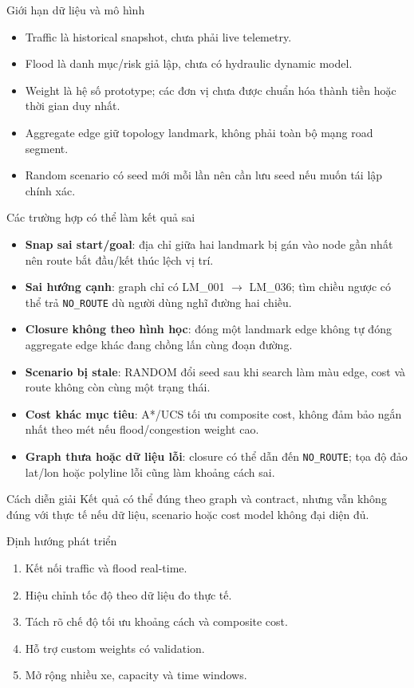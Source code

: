 \documentclass[aspectratio=169,11pt]{beamer}
\begin{document}
\begin{frame}{Giới hạn dữ liệu và mô hình}
\begin{itemize}
  \item Traffic là historical snapshot, chưa phải live telemetry.
  \item Flood là danh mục/risk giả lập, chưa có hydraulic dynamic model.
  \item Weight là hệ số prototype; các đơn vị chưa được chuẩn hóa thành tiền hoặc thời gian duy nhất.
  \item Aggregate edge giữ topology landmark, không phải toàn bộ mạng road segment.
  \item Random scenario có seed mới mỗi lần nên cần lưu seed nếu muốn tái lập chính xác.
\end{itemize}
\end{frame}

\begin{frame}{Các trường hợp có thể làm kết quả sai}
\footnotesize
\begin{itemize}
  \item \textbf{Snap sai start/goal}: địa chỉ giữa hai landmark bị gán vào node gần nhất nên route bắt đầu/kết thúc lệch vị trí.
  \item \textbf{Sai hướng cạnh}: graph chỉ có LM\_001 $\rightarrow$ LM\_036; tìm chiều ngược có thể trả \texttt{NO\_ROUTE} dù người dùng nghĩ đường hai chiều.
  \item \textbf{Closure không theo hình học}: đóng một landmark edge không tự đóng aggregate edge khác đang chồng lấn cùng đoạn đường.
  \item \textbf{Scenario bị stale}: RANDOM đổi seed sau khi search làm màu edge, cost và route không còn cùng một trạng thái.
  \item \textbf{Cost khác mục tiêu}: A*/UCS tối ưu composite cost, không đảm bảo ngắn nhất theo mét nếu flood/congestion weight cao.
  \item \textbf{Graph thưa hoặc dữ liệu lỗi}: closure có thể dẫn đến \texttt{NO\_ROUTE}; tọa độ đảo lat/lon hoặc polyline lỗi cũng làm khoảng cách sai.
\end{itemize}
\begin{alertblock}{Cách diễn giải}
Kết quả có thể đúng theo graph và contract, nhưng vẫn không đúng với thực tế nếu dữ liệu, scenario hoặc cost model không đại diện đủ.
\end{alertblock}
\end{frame}

\begin{frame}{Định hướng phát triển}
\begin{enumerate}
  \item Kết nối traffic và flood real-time.
  \item Hiệu chỉnh tốc độ theo dữ liệu đo thực tế.
  \item Tách rõ chế độ tối ưu khoảng cách và composite cost.
  \item Hỗ trợ custom weights có validation.
  \item Mở rộng nhiều xe, capacity và time windows.
\end{enumerate}
\end{frame}
\end{document}
